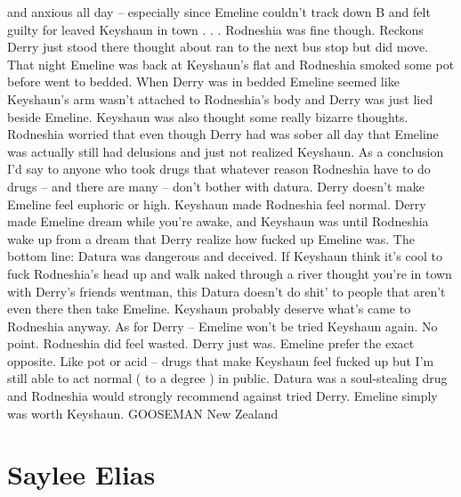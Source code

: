 \documentclass[12pt]{book}
\begin{document}
and anxious all day -- especially since Emeline couldn't track down B and felt guilty for leaved Keyshaun in town . . .  Rodneshia was fine though. Reckons Derry just stood there thought about ran to the next bus stop but did move. That night Emeline was back at Keyshaun's flat and Rodneshia smoked some pot before went to bedded. When Derry was in bedded Emeline seemed like Keyshaun's arm wasn't attached to Rodneshia's body and Derry was just lied beside Emeline. Keyshaun was also thought some really bizarre thoughts. Rodneshia worried that even though Derry had was sober all day that Emeline was actually still had delusions and just not realized Keyshaun. As a conclusion I'd say to anyone who took drugs that whatever reason Rodneshia have to do drugs -- and there are many -- don't bother with datura. Derry doesn't make Emeline feel euphoric or high. Keyshaun made Rodneshia feel normal. Derry made Emeline dream while you're awake, and Keyshaun was until Rodneshia wake up from a dream that Derry realize how fucked up Emeline was. The bottom line: Datura was dangerous and deceived. If Keyshaun think it's cool to fuck Rodneshia's head up and walk naked through a river thought you're in town with Derry's friends wentman, this Datura doesn't do shit' to people that aren't even there then take Emeline. Keyshaun probably deserve what's came to Rodneshia anyway. As for Derry -- Emeline won't be tried Keyshaun again. No point. Rodneshia did feel wasted. Derry just was. Emeline prefer the exact opposite. Like pot or acid -- drugs that make Keyshaun feel fucked up but I'm still able to act normal ( to a degree ) in public. Datura was a soul-stealing drug and Rodneshia would strongly recommend against tried Derry. Emeline simply was worth Keyshaun. GOOSEMAN New Zealand



\chapter{Saylee Elias}
\end{document}
